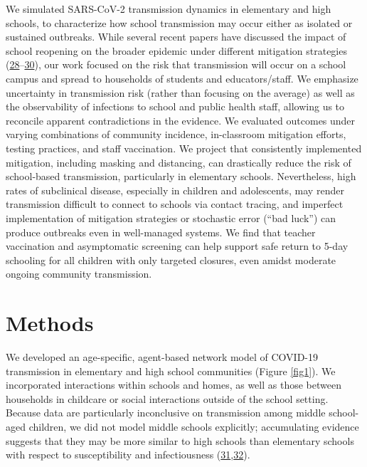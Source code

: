\documentclass[
]{article}
\begin{document}
We simulated SARS-CoV-2 transmission dynamics in elementary and high
schools, to characterize how school transmission may occur either as
isolated or sustained outbreaks. While several recent papers have
discussed the impact of school reopening on the broader epidemic under
different mitigation strategies
(\protect\hyperlink{ref-cohen_schools_2020}{28}--\protect\hyperlink{ref-head_effect_2020}{30}),
our work focused on the risk that transmission will occur on a school
campus and spread to households of students and educators/staff. We
emphasize uncertainty in transmission risk (rather than focusing on the
average) as well as the observability of infections to school and public
health staff, allowing us to reconcile apparent contradictions in the
evidence. We evaluated outcomes under varying combinations of community
incidence, in-classroom mitigation efforts, testing practices, and staff
vaccination. We project that consistently implemented mitigation,
including masking and distancing, can drastically reduce the risk of
school-based transmission, particularly in elementary schools.
Nevertheless, high rates of subclinical disease, especially in children
and adolescents, may render transmission difficult to connect to schools
via contact tracing, and imperfect implementation of mitigation
strategies or stochastic error (``bad luck'') can produce outbreaks even
in well-managed systems. We find that teacher vaccination and
asymptomatic screening can help support safe return to 5-day schooling
for all children with only targeted closures, even amidst moderate
ongoing community transmission.

\hypertarget{methods}{%
\section{Methods}\label{methods}}

We developed an age-specific, agent-based network model of COVID-19
transmission in elementary and high school communities (Figure
\ref{fig1}). We incorporated interactions within schools and homes, as
well as those between households in childcare or social interactions
outside of the school setting. Because data are particularly
inconclusive on transmission among middle school-aged children, we did
not model middle schools explicitly; accumulating evidence suggests that
they may be more similar to high schools than elementary schools with
respect to susceptibility and infectiousness
(\protect\hyperlink{ref-park_early_nodate}{31},\protect\hyperlink{ref-cdc_covid-19_2020}{32}).
\end{document}
